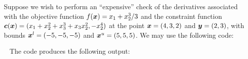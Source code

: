 \documentclass{galahad}
\begin{document}





\galexamples
Suppose we wish to perform an ``expensive'' check of the derivatives associated with the objective function
$f({\bm{x}}) = x_1 + x_2^3/3$ and the constraint function
${\bm{c}}({\bm{x}}) = (x_1 + x_2^2 + x_3^3 + x_3x_2^2, -x_2^4)$ at the point
${\bm{x}} = (4,3,2)$ and ${\bm{y}} = (2,3)$, with bounds ${\bm{x}}^l = (-5,-5,-5)$ and
${\bm{x}}^u = (5,5,5)$.
We may use the following code:

{\tt \small
\VerbatimInput{\packageexample}
}
\noindent
The code produces the following output:
{\tt \small
\VerbatimInput{\packageresults}
}

\noindent
\end{document}

